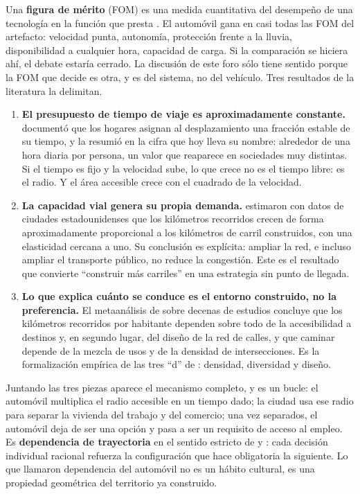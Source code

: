 \documentclass[11pt,letterpaper]{article}
\begin{document}
Una \textbf{figura de mérito} (FOM) es una medida cuantitativa del desempeño de
una tecnología en la función que presta \parencite{deweck2022}. El automóvil
gana en casi todas las FOM del artefacto: velocidad punta, autonomía,
protección frente a la lluvia, disponibilidad a cualquier hora, capacidad de
carga. Si la comparación se hiciera ahí, el debate estaría cerrado. La
discusión de este foro sólo tiene sentido porque la FOM que decide es otra, y
es del sistema, no del vehículo. Tres resultados de la literatura la delimitan.

\begin{enumerate}
  \item \textbf{El presupuesto de tiempo de viaje es aproximadamente
    constante.} \textcite{zahavi1974} documentó que los hogares asignan al
    desplazamiento una fracción estable de su tiempo, y \textcite{marchetti1994}
    la resumió en la cifra que hoy lleva su nombre: alrededor de una hora
    diaria por persona, un valor que reaparece en sociedades muy distintas.
    Si el tiempo es fijo y la velocidad sube, lo que crece no es el tiempo
    libre: es el radio. Y el área accesible crece con el cuadrado de la
    velocidad.
  \item \textbf{La capacidad vial genera su propia demanda.}
    \textcite{duranton2011} estimaron con datos de ciudades estadounidenses que
    los kilómetros recorridos crecen de forma aproximadamente proporcional a
    los kilómetros de carril construidos, con una elasticidad cercana a uno.
    Su conclusión es explícita: ampliar la red, e incluso ampliar el transporte
    público, no reduce la congestión. Este es el resultado que convierte
    \enquote{construir más carriles} en una estrategia sin punto de llegada.
  \item \textbf{Lo que explica cuánto se conduce es el entorno construido, no
    la preferencia.} El metaanálisis de \textcite{ewing2010} sobre decenas de
    estudios concluye que los kilómetros recorridos por habitante dependen
    sobre todo de la accesibilidad a destinos y, en segundo lugar, del diseño
    de la red de calles, y que caminar depende de la mezcla de usos y de la
    densidad de intersecciones. Es la formalización empírica de las tres
    \enquote{d} de \textcite{cervero1997}: densidad, diversidad y diseño.
\end{enumerate}

Juntando las tres piezas aparece el mecanismo completo, y es un bucle:
el automóvil multiplica el radio accesible en un tiempo dado; la ciudad usa ese
radio para separar la vivienda del trabajo y del comercio; una vez separados,
el automóvil deja de ser una opción y pasa a ser un requisito de acceso al
empleo. Es \textbf{dependencia de trayectoria} en el sentido estricto de
\textcite{david1985} y \textcite{arthur1989}: cada decisión individual
racional refuerza la configuración que hace obligatoria la siguiente. Lo que
\textcite{newman1999} llamaron dependencia del automóvil no es un hábito
cultural, es una propiedad geométrica del territorio ya construido.
\end{document}
